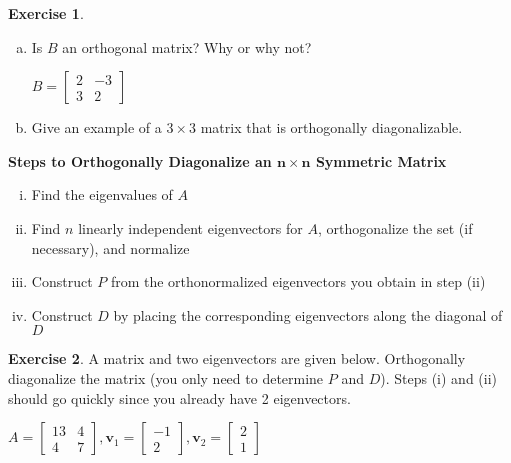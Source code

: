 \documentclass[10pt]{book}
\newcommand{\boxcolor}{gray!30}
\newenvironment{boxme}{\begin{mdframed}[backgroundcolor=\boxcolor,linewidth=0pt,nobreak=true]}{\end{mdframed}}
\theoremstyle{definition}
\newtheorem{exercise}{Exercise}[section]
\newcommand{\vect}[1]{\ensuremath{\boldsymbol{\mathbf{#1}}}}
\begin{document}
\begin{exercise} %
	\begin{enumerate}[(a)]
		\item Is $B$ an orthogonal matrix? Why or why not? \par
		$ B = \begin{bmatrix}2&-3\\3&2\end{bmatrix} $
		\item Give an example of a $3\times 3$ matrix that is orthogonally diagonalizable.
	\end{enumerate}
\end{exercise}
\vfill


\newpage


\begin{boxme}
	\textbf{Steps to Orthogonally Diagonalize an $\boldsymbol{n\times n}$ Symmetric Matrix}
	\begin{enumerate}[(i)]\itemsep=0em
		\item Find the eigenvalues of $A$ 
		\item Find $n$ linearly independent eigenvectors for $A$, orthogonalize the set (if necessary), and normalize
		\item Construct $P$ from the orthonormalized eigenvectors you obtain in step (ii)
		\item Construct $D$ by placing the corresponding eigenvectors along the diagonal of $D$
	\end{enumerate}
\end{boxme}


\begin{exercise} %
	A matrix and two eigenvectors are given below. Orthogonally diagonalize the matrix (you only need to determine $P$ and $D$). Steps (i) and (ii) should go quickly since you already have 2 eigenvectors. \par
	$ A = \begin{bmatrix}13&4\\4&7\end{bmatrix}, 
	\vect{v}_1 = \begin{bmatrix}-1\\2\end{bmatrix}, 
	\vect{v}_2 = \begin{bmatrix}2\\1\end{bmatrix} $
\end{exercise}
\vfill
\end{document}
